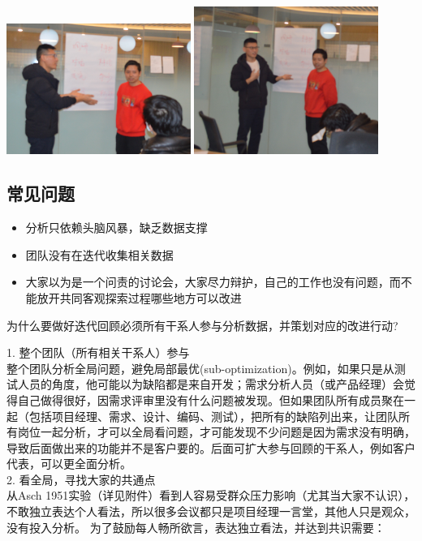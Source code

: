 \includegraphics[width=6cm]{1498.png}
\includegraphics[width=6cm]{1499.png}

\hypertarget{ux5e38ux89c1ux95eeux9898}{%
\subsection{常见问题}\label{ux5e38ux89c1ux95eeux9898}}

\begin{itemize}
\tightlist
\item
  分析只依赖头脑风暴，缺乏数据支撑
\item
  团队没有在迭代收集相关数据
\item
  大家以为是一个问责的讨论会，大家尽力辩护，自己的工作也没有问题，而不能放开共同客观探索过程哪些地方可以改进
\end{itemize}

为什么要做好迭代回顾必须所有干系人参与分析数据，并策划对应的改进行动?

1. 整个团队（所有相关干系人）参与\\
整个团队分析全局问题，避免局部最优(sub-optimization)。例如，如果只是从测试人员的角度，他可能以为缺陷都是来自开发；需求分析人员（或产品经理）会觉得自己做得很好，因需求评审里没有什么问题被发现。但如果团队所有成员聚在一起（包括项目经理、需求、设计、编码、测试），把所有的缺陷列出来，让团队所有岗位一起分析，才可以全局看问题，才可能发现不少问题是因为需求没有明确，导致后面做出来的功能并不是客户要的。后面可扩大参与回顾的干系人，例如客户代表，可以更全面分析。\\
2. 看全局，寻找大家的共通点\\
从Asch
1951实验（详见附件）看到人容易受群众压力影响（尤其当大家不认识），不敢独立表达个人看法，所以很多会议都只是项目经理一言堂，其他人只是观众，没有投入分析。
为了鼓励每人畅所欲言，表达独立看法，并达到共识需要：

